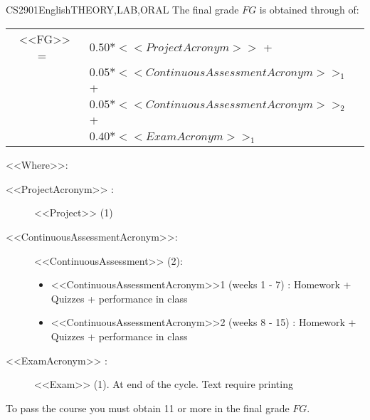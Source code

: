    \begin{evaluation}{CS2901}{English}{THEORY,LAB,ORAL}
    The final grade $FG$ is obtained through of:
    
    \begin{tabular}{cl}
        <<FG>> =~ & $0.50*<<ProjectAcronym>>$ + \\
                  & $0.05*<<ContinuousAssessmentAcronym>>_{1}$ + \\
                  & $0.05*<<ContinuousAssessmentAcronym>>_{2}$ +  \\
                  & $0.40*<<ExamAcronym>>_{1}$
    \end{tabular}
    
    \noindent <<Where>>:
    \begin{description}
       \item[<<ProjectAcronym>> :] <<Project>> (1)
        \item[<<ContinuousAssessmentAcronym>>:] <<ContinuousAssessment>> (2):
         \begin{itemize}
                  \item  <<ContinuousAssessmentAcronym>>1 (weeks 1 - 7) : Homework + Quizzes + performance in class
                  \item <<ContinuousAssessmentAcronym>>2 (weeks 8 - 15) : Homework +  Quizzes + performance in class
         \end{itemize}
       \item[<<ExamAcronym>> :]  <<Exam>> (1).  At end of the cycle. Text require printing
    \end{description}
    
    \noindent To pass the course you must obtain 11 or more in the final grade $FG$.
    \end{evaluation}
    
